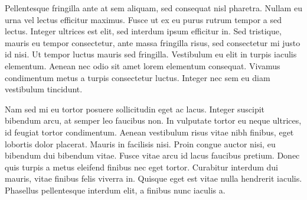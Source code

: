 Pellentesque fringilla ante at sem aliquam, sed consequat nisl pharetra. Nullam eu urna vel lectus efficitur maximus. Fusce ut ex eu purus rutrum tempor a sed lectus. Integer ultrices est elit, sed interdum ipsum efficitur in. Sed tristique, mauris eu tempor consectetur, ante massa fringilla risus, sed consectetur mi justo id nisi. Ut tempor luctus mauris sed fringilla. Vestibulum eu elit in turpis iaculis elementum. Aenean nec odio sit amet lorem elementum consequat. Vivamus condimentum metus a turpis consectetur luctus. Integer nec sem eu diam vestibulum tincidunt.

Nam sed mi eu tortor posuere sollicitudin eget ac lacus. Integer suscipit bibendum arcu, at semper leo faucibus non. In vulputate tortor eu neque ultrices, id feugiat tortor condimentum. Aenean vestibulum risus vitae nibh finibus, eget lobortis dolor placerat. Mauris in facilisis nisi. Proin congue auctor nisi, eu bibendum dui bibendum vitae. Fusce vitae arcu id lacus faucibus pretium. Donec quis turpis a metus eleifend finibus nec eget tortor. Curabitur interdum dui mauris, vitae finibus felis viverra in. Quisque eget est vitae nulla hendrerit iaculis. Phasellus pellentesque interdum elit, a finibus nunc iaculis a. 

